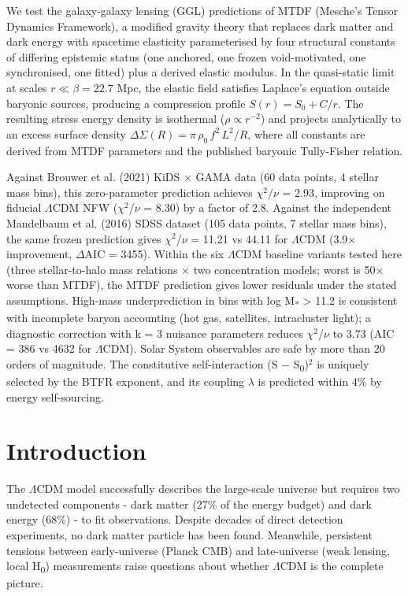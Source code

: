 \documentclass[11pt,a4paper]{article}
\begin{document}
We test the galaxy-galaxy lensing (GGL) predictions of MTDF (Mesche's Tensor Dynamics Framework), a modified gravity theory that replaces dark matter and dark energy with spacetime elasticity parameterised by four structural constants of differing epistemic status (one anchored, one frozen void-motivated, one synchronised, one fitted) plus a derived elastic modulus. In the quasi-static limit at scales \(r \ll \beta = 22.7\) Mpc, the elastic field satisfies Laplace's equation outside baryonic sources, producing a compression profile \(S(r) = S_0 + C/r\). The resulting stress energy density is isothermal (\(\rho \propto r^{-2}\)) and projects analytically to an excess surface density \(\Delta\Sigma(R) = \pi\,\rho_0\,f^2\,L^2 / R\), where all constants are derived from MTDF parameters and the published baryonic Tully-Fisher relation.

Against Brouwer et al. (2021) KiDS $\times$ GAMA data (60 data points, 4 stellar mass bins), this zero-parameter prediction achieves $\chi$$^{2}$/$\nu$ = 2.93, improving on fiducial $\Lambda$CDM NFW ($\chi$$^{2}$/$\nu$ = 8.30) by a factor of 2.8. Against the independent Mandelbaum et al. (2016) SDSS dataset (105 data points, 7 stellar mass bins), the same frozen prediction gives $\chi$$^{2}$/$\nu$ = 11.21 vs 44.11 for $\Lambda$CDM (3.9$\times$ improvement, $\Delta$AIC = 3455). Within the six $\Lambda$CDM baseline variants tested here (three stellar-to-halo mass relations $\times$ two concentration models; worst is 50$\times$ worse than MTDF), the MTDF prediction gives lower residuals under the stated assumptions. High-mass underprediction in bins with log M\textsubscript{*} > 11.2 is consistent with incomplete baryon accounting (hot gas, satellites, intracluster light); a diagnostic correction with k = 3 nuisance parameters reduces $\chi$$^{2}$/$\nu$ to 3.73 (AIC = 386 vs 4632 for $\Lambda$CDM). Solar System observables are safe by more than 20 orders of magnitude. The constitutive self-interaction (S $-$ S\textsubscript{0})$^{2}$ is uniquely selected by the BTFR exponent, and its coupling $\lambda$ is predicted within 4\% by energy self-sourcing.

\section{Introduction}
\label{sec:intro}
The $\Lambda$CDM model successfully describes the large-scale universe but requires two undetected components  -  dark matter (27\% of the energy budget) and dark energy (68\%)  -  to fit observations. Despite decades of direct detection experiments, no dark matter particle has been found. Meanwhile, persistent tensions between early-universe (Planck CMB) and late-universe (weak lensing, local H\textsubscript{0}) measurements raise questions about whether $\Lambda$CDM is the complete picture.
\end{document}
